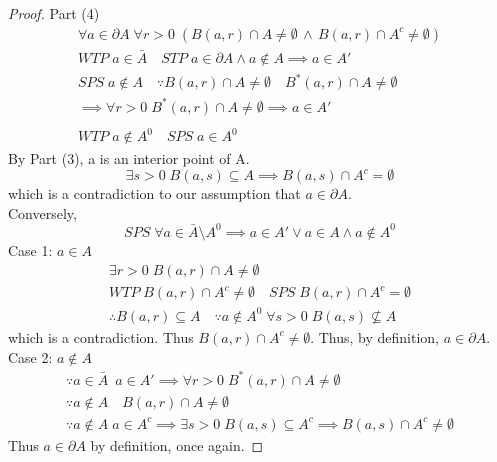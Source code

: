 \documentclass[11pt, oneside]{book}
\theoremstyle{break}
\newtheorem*{proof}{Proof}
\begin{document}
\begin{proof}
	Part (4) \\
	\begin{gather*}
		\forall a \in \partial A \; \forall r > 0 \; (B(a, r) \cap A \neq \emptyset \, \land \, B(a, r) \cap A^c \neq \emptyset) \\
		WTP \; a \in \bar{A} \quad STP \; a \in \partial A \land a \notin A \implies a \in A' \\
		SPS \; a \notin A \quad \because B(a, r) \cap A \neq \emptyset \quad B^*(a, r) \cap A \neq \emptyset \\
		\implies \forall r > 0 \; B^*(a, r) \cap A \neq \emptyset \implies a \in A' \\
		\\
		WTP \; a \notin A^0 \quad SPS \; a \in A^0
	\end{gather*}
	By Part (3), a is an interior point of A.
	\begin{equation*}
		\exists s > 0 \; B(a, s) \subseteq A \implies B(a, s) \cap A^c = \emptyset
	\end{equation*}
	which is a contradiction to our assumption that $a \in \partial A$. \\
	Conversely,
	\begin{equation*}
		SPS \; \forall a \in \bar{A} \setminus A^0 \implies a \in A' \lor a \in A \land a \notin A^0
	\end{equation*}
	Case 1: $a \in A$
	\begin{gather*}
		\exists r > 0 \; B(a, r) \cap A \neq \emptyset \\
		WTP \; B(a, r) \cap A^c \neq \emptyset \quad SPS \; B(a, r) \cap A^c = \emptyset \\
		\therefore B(a, r) \subseteq A \quad \because a \notin A^0 \; \forall s > 0 \; B(a, s) \nsubseteq A
	\end{gather*}
	which is a contradiction. Thus $B(a, r) \cap A^c \neq \emptyset$. Thus, by definition, $a \in \partial A$. \\
	Case 2: $a \notin A$
	\begin{gather*}
		\because a \in \bar{A} \enspace a \in A' \implies \forall r > 0 \; B^*(a, r) \cap A \neq \emptyset \\
		\because a \notin A \quad B(a, r) \cap A \neq \emptyset \\
		\because a \notin A \; a \in A^c \implies \exists s > 0 \; B(a, s) \subseteq A^c \implies B(a, s) \cap A^c \neq \emptyset
	\end{gather*}
	Thus $a \in \partial A$ by definition, once again.
\end{proof}
\end{document}

